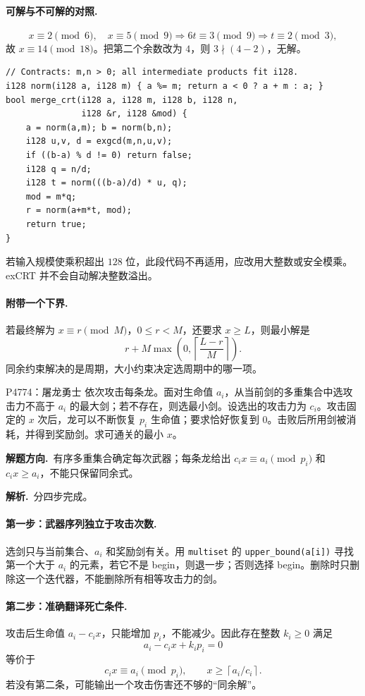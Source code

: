 \documentclass[UTF8,a4paper,11pt,oneside,openany,fontset=fandol]{ctexbook}
\theoremstyle{definition}
\newcommand{\ceil}[1]{\left\lceil #1\right\rceil}
\newcommand{\sol}{\par\noindent\textbf{解析.}\ }
\newcommand{\hint}{\par\noindent\textbf{解题方向.}\ }
\begin{document}
\paragraph{可解与不可解的对照.}
\[
 x\equiv2\pmod6,\quad x\equiv5\pmod9
 \Longrightarrow 6t\equiv3\pmod9
 \Longrightarrow t\equiv2\pmod3,
\]
故 $x\equiv14\pmod{18}$。把第二个余数改为 $4$，则 $3\nmid(4-2)$，无解。

\begin{lstlisting}
// Contracts: m,n > 0; all intermediate products fit i128.
i128 norm(i128 a, i128 m) { a %= m; return a < 0 ? a + m : a; }
bool merge_crt(i128 a, i128 m, i128 b, i128 n,
               i128 &r, i128 &mod) {
    a = norm(a,m); b = norm(b,n);
    i128 u,v, d = exgcd(m,n,u,v);
    if ((b-a) % d != 0) return false;
    i128 q = n/d;
    i128 t = norm(((b-a)/d) * u, q);
    mod = m*q;
    r = norm(a+m*t, mod);
    return true;
}
\end{lstlisting}
若输入规模使乘积超出 $128$ 位，此段代码不再适用，应改用大整数或安全模乘。exCRT 并不会自动解决整数溢出。

\paragraph{附带一个下界.} 若最终解为 $x\equiv r\pmod M$，$0\le r<M$，还要求 $x\ge L$，则最小解是
\[
 r+M\max\!\left(0,\ceil{\frac{L-r}{M}}\right).
\]
同余约束解决的是周期，大小约束决定选周期中的哪一项。


\begin{problem}{P4774：屠龙勇士}
依次攻击每条龙。面对生命值 $a_i$，从当前剑的多重集合中选攻击力不高于 $a_i$ 的最大剑；若不存在，则选最小剑。设选出的攻击力为 $c_i$。攻击固定的 $x$ 次后，龙可以不断恢复 $p_i$ 生命值；要求恰好恢复到 $0$。击败后所用剑被消耗，并得到奖励剑。求可通关的最小 $x$。
\end{problem}
\hint 有序多重集合确定每次武器；每条龙给出 $c_ix\equiv a_i\pmod{p_i}$ 和 $c_ix\ge a_i$，不能只保留同余式。

\sol 分四步完成。
\paragraph{第一步：武器序列独立于攻击次数.}
选剑只与当前集合、$a_i$ 和奖励剑有关。用 \texttt{multiset} 的 \texttt{upper\_bound(a[i])} 寻找第一个大于 $a_i$ 的元素，若它不是 begin，则退一步；否则选择 begin。删除时只删除这一个迭代器，不能删除所有相等攻击力的剑。

\paragraph{第二步：准确翻译死亡条件.}
攻击后生命值 $a_i-c_ix$，只能增加 $p_i$，不能减少。因此存在整数 $k_i\ge0$ 满足
\[
 a_i-c_ix+k_ip_i=0
\]
等价于
\[
 c_ix\equiv a_i\pmod{p_i},\qquad x\ge\ceil{a_i/c_i}.
\]
若没有第二条，可能输出一个攻击伤害还不够的“同余解”。
\end{document}
